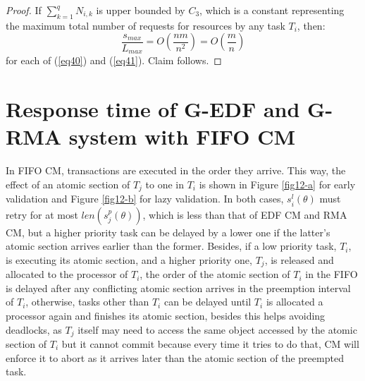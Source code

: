 \documentclass[a4paper,english]{article}
\newtheorem{proof}{Proof}
\begin{document}
\begin{proof}
If $\sum_{k=1}^{q}N_{i,k}$ is upper bounded by $C_{3}$, which is
a constant representing the maximum total number of requests for resources
by any task $T_{i}$, then:
\begin{equation}
\frac{s_{max}}{L_{max}}=O\left(\frac{nm}{n^{2}}\right)=O\left(\frac{m}{n}\right)
\label{eq46}
\end{equation}
for each of (\ref{eq40}) and (\ref{eq41}). Claim follows.
\end{proof}

\section{\label{FIFO}Response time of G-EDF and G-RMA system with FIFO CM}

In FIFO CM, transactions are executed in the order they arrive. This
way, the effect of an atomic section of $T_{j}$ to one in $T_{i}$
is shown in Figure \ref{fig12-a} for early validation and Figure
\ref{fig12-b} for lazy validation. In both cases, $s_{i}^{l}(\theta)$
must retry for at most $len(s_{j}^{p}(\theta))$, which is less than
that of EDF CM and RMA CM, but a higher priority task can be delayed
by a lower one if the latter's atomic section arrives earlier than
the former. Besides, if a low priority task, $T_i$, is executing its atomic section, and a higher priority one, $T_j$, is released and allocated to the processor of $T_i$, the order of the atomic section of $T_i$ in the FIFO is delayed after any conflicting atomic section arrives in the preemption interval of $T_i$, otherwise, tasks other than $T_i$ can be delayed until $T_i$ is allocated a processor again and finishes its atomic section, besides this helps avoiding deadlocks, as $T_j$ itself may need to access the same object accessed by the atomic section of $T_i$ but it cannot commit because every time it tries to do that, CM will enforce it to abort as it arrives later than the atomic section of the preempted task.
\end{document}
